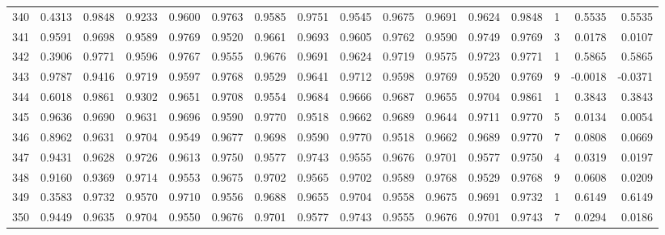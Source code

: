 \begin{tabular}{lrrrrrrrrrrrrrrr}
340 &      0.4313 &  0.9848 &  0.9233 &  0.9600 &  0.9763 &  0.9585 &  0.9751 &  0.9545 &  0.9675 &  0.9691 &   0.9624 &     0.9848 &      1 &                    0.5535 &                     0.5535 \\
341 &      0.9591 &  0.9698 &  0.9589 &  0.9769 &  0.9520 &  0.9661 &  0.9693 &  0.9605 &  0.9762 &  0.9590 &   0.9749 &     0.9769 &      3 &                    0.0178 &                     0.0107 \\
342 &      0.3906 &  0.9771 &  0.9596 &  0.9767 &  0.9555 &  0.9676 &  0.9691 &  0.9624 &  0.9719 &  0.9575 &   0.9723 &     0.9771 &      1 &                    0.5865 &                     0.5865 \\
343 &      0.9787 &  0.9416 &  0.9719 &  0.9597 &  0.9768 &  0.9529 &  0.9641 &  0.9712 &  0.9598 &  0.9769 &   0.9520 &     0.9769 &      9 &                   -0.0018 &                    -0.0371 \\
344 &      0.6018 &  0.9861 &  0.9302 &  0.9651 &  0.9708 &  0.9554 &  0.9684 &  0.9666 &  0.9687 &  0.9655 &   0.9704 &     0.9861 &      1 &                    0.3843 &                     0.3843 \\
345 &      0.9636 &  0.9690 &  0.9631 &  0.9696 &  0.9590 &  0.9770 &  0.9518 &  0.9662 &  0.9689 &  0.9644 &   0.9711 &     0.9770 &      5 &                    0.0134 &                     0.0054 \\
346 &      0.8962 &  0.9631 &  0.9704 &  0.9549 &  0.9677 &  0.9698 &  0.9590 &  0.9770 &  0.9518 &  0.9662 &   0.9689 &     0.9770 &      7 &                    0.0808 &                     0.0669 \\
347 &      0.9431 &  0.9628 &  0.9726 &  0.9613 &  0.9750 &  0.9577 &  0.9743 &  0.9555 &  0.9676 &  0.9701 &   0.9577 &     0.9750 &      4 &                    0.0319 &                     0.0197 \\
348 &      0.9160 &  0.9369 &  0.9714 &  0.9553 &  0.9675 &  0.9702 &  0.9565 &  0.9702 &  0.9589 &  0.9768 &   0.9529 &     0.9768 &      9 &                    0.0608 &                     0.0209 \\
349 &      0.3583 &  0.9732 &  0.9570 &  0.9710 &  0.9556 &  0.9688 &  0.9655 &  0.9704 &  0.9558 &  0.9675 &   0.9691 &     0.9732 &      1 &                    0.6149 &                     0.6149 \\
350 &      0.9449 &  0.9635 &  0.9704 &  0.9550 &  0.9676 &  0.9701 &  0.9577 &  0.9743 &  0.9555 &  0.9676 &   0.9701 &     0.9743 &      7 &                    0.0294 &                     0.0186 \\

\end{tabular}
